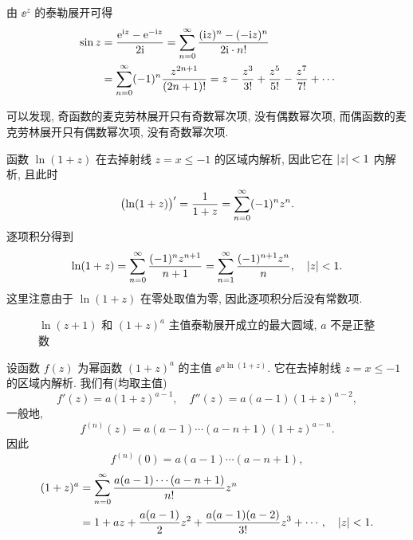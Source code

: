 \begin{example}
  由 $\ee^z$ 的泰勒展开可得
  \begin{align*}
     \sin z&
    =\frac{\mathrm{e}^{\mathrm{i} z}-\mathrm{e}^{-\mathrm{i} z}}{2\mathrm{i}}
    =\displaystyle\sum_{n=0}^{\infty} \frac{(\mathrm{i} z)^n-(-\mathrm{i} z)^n}{2\mathrm{i}\cdot n!}\\&
    =\displaystyle\sum_{n=0}^{\infty} (-1)^n\frac{z^{2n+1}}{(2n+1)!}
    =z-\frac{z^3}{3!}+\frac{z^5}{5!}-\frac{z^7}{7!}+\cdots
  \end{align*}
\end{example}

可以发现, 奇函数的麦克劳林展开只有奇数幂次项, 没有偶数幂次项, 而偶函数的麦克劳林展开只有偶数幂次项, 没有奇数幂次项.

\begin{example}
  函数 $\ln(1+z)$ 在去掉射线 $z=x\le-1$ 的区域内解析, 因此它在 $\lvert z\rvert<1$ 内解析, 且此时
  \[
     \bigl(\ln(1+z)\bigr)'
    =\frac1{1+z}
    =\displaystyle\sum_{n=0}^{\infty} (-1)^nz^n.
  \]
  逐项积分得到
  \[
     \ln(1+z)
    =\displaystyle\sum_{n=0}^{\infty} \frac{(-1)^nz^{n+1}}{n+1}
    =\displaystyle\sum_{n=1}^{\infty} \frac{(-1)^{n+1}z^n}{n},\quad\lvert z\rvert<1.
  \]
  这里注意由于 $\ln(1+z)$ 在零处取值为零, 因此逐项积分后没有常数项.
\end{example}

\begin{figure}[H]
  \centering
  \caption{$\ln(z+1)$ 和 $(1+z)^a$ 主值泰勒展开成立的最大圆域, $a$ 不是正整数}
\end{figure}

\begin{example}
  \label{exam:power-taylor-series}
  设函数 $f(z)$ 为幂函数 $(1+z)^a$ 的主值 $\ee^{a\ln(1+z)}$. 它在去掉射线 $z=x\le -1$ 的区域内解析.
  我们有(均取主值)
  \[
    f'(z)=a(1+z)^{a-1},\quad
    f''(z)=a (a-1)(1+z)^{a-2},
  \]
  一般地,
  \[
    f^{(n)}(z)=a(a-1)\cdots(a-n+1)(1+z)^{a-n}.
  \]
  因此
  \[
    f^{(n)}(0)=a(a-1)\cdots(a-n+1),
  \]
  \begin{align*}
     (1+z)^a&
    =\displaystyle\sum_{n=0}^{\infty} \frac{a(a-1)\cdots(a-n+1)}{n!}z^n\\&
    =1+a z+\frac{a(a-1)}2z^2+\frac{a(a-1)(a-2)}{3!}z^3+\cdots,\quad \lvert z\rvert<1.
  \end{align*}
\end{example}

